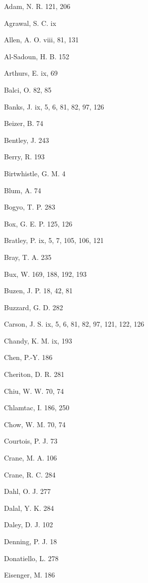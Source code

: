 \noindent Adam, N. R. 121, 206\par
\noindent Agrawal, S. C. ix\par
\noindent Allen, A. O. viii, 81, 131\par
\noindent Al-Sadoun, H. B. 152\par
\noindent Arthurs, E. ix, 69\par
\noindent Balci, O. 82, 85\par
\noindent Banks, J. ix, 5, 6, 81, 82, 97, 126\par
\noindent Beizer, B. 74\par
\noindent Bentley, J. 243\par
\noindent Berry, R. 193\par
\noindent Birtwhistle, G. M. 4\par
\noindent Blum, A. 74\par
\noindent Bogyo, T. P. 283\par
\noindent Box, G. E. P. 125, 126\par
\noindent Bratley, P. ix, 5, 7, 105, 106, 121\par
\noindent Bray, T. A. 235\par
\noindent Bux, W. 169, 188, 192, 193\par
\noindent Buzen, J. P. 18, 42, 81\par
\noindent Buzzard, G. D. 282\par
\noindent Carson, J. S. ix, 5, 6, 81, 82, 97, 121, 122, 126\par
\noindent Chandy, K. M. ix, 193\par
\noindent Chen, P.-Y. 186\par
\noindent Cheriton, D. R. 281\par
\noindent Chiu, W. W. 70, 74\par
\noindent Chlamtac, I. 186, 250\par
\noindent Chow, W. M. 70, 74\par
\noindent Courtois, P. J. 73\par
\noindent Crane, M. A. 106\par
\noindent Crane, R. C. 284\par
\noindent Dahl, O. J. 277\par
\noindent Dalal, Y. K. 284\par
\noindent Daley, D. J. 102\par
\noindent Denning, P. J. 18\par
\noindent Donatiello, L. 278\par
\noindent Eisenger, M. 186\par
